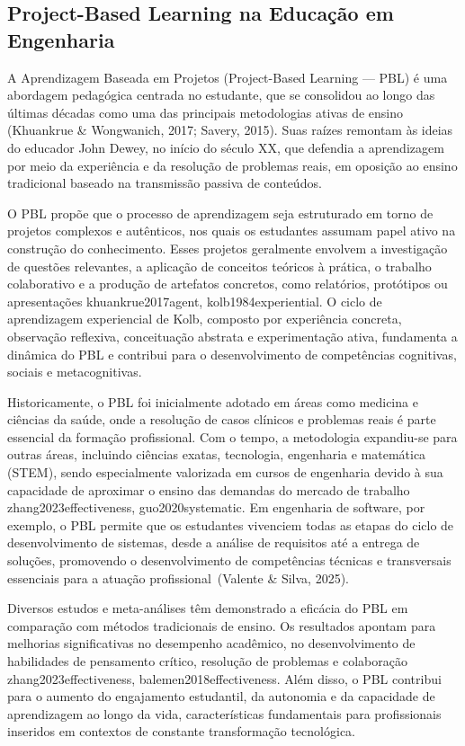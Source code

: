\documentclass[english, spanish, brazilian]{modelo_dt}
\begin{document}
\subsection{Project-Based Learning na Educação em Engenharia}

A Aprendizagem Baseada em Projetos (Project-Based Learning — PBL) é uma abordagem pedagógica centrada no estudante, que se consolidou ao longo das últimas décadas como uma das principais metodologias ativas de ensino (Khuankrue & Wongwanich, 2017; Savery, 2015). Suas raízes remontam às ideias do educador John Dewey, no início do século XX, que defendia a aprendizagem por meio da experiência e da resolução de problemas reais, em oposição ao ensino tradicional baseado na transmissão passiva de conteúdos.

O PBL propõe que o processo de aprendizagem seja estruturado em torno de projetos complexos e autênticos, nos quais os estudantes assumam papel ativo na construção do conhecimento. Esses projetos geralmente envolvem a investigação de questões relevantes, a aplicação de conceitos teóricos à prática, o trabalho colaborativo e a produção de artefatos concretos, como relatórios, protótipos ou apresentações {khuankrue2017agent, kolb1984experiential}. O ciclo de aprendizagem experiencial de Kolb, composto por experiência concreta, observação reflexiva, conceituação abstrata e experimentação ativa, fundamenta a dinâmica do PBL e contribui para o desenvolvimento de competências cognitivas, sociais e metacognitivas.

Historicamente, o PBL foi inicialmente adotado em áreas como medicina e ciências da saúde, onde a resolução de casos clínicos e problemas reais é parte essencial da formação profissional. Com o tempo, a metodologia expandiu-se para outras áreas, incluindo ciências exatas, tecnologia, engenharia e matemática (STEM), sendo especialmente valorizada em cursos de engenharia devido à sua capacidade de aproximar o ensino das demandas do mercado de trabalho {zhang2023effectiveness, guo2020systematic}. Em engenharia de software, por exemplo, o PBL permite que os estudantes vivenciem todas as etapas do ciclo de desenvolvimento de sistemas, desde a análise de requisitos até a entrega de soluções, promovendo o desenvolvimento de competências técnicas e transversais essenciais para a atuação profissional~(Valente & Silva, 2025).

Diversos estudos e meta-análises têm demonstrado a eficácia do PBL em comparação com métodos tradicionais de ensino. Os resultados apontam para melhorias significativas no desempenho acadêmico, no desenvolvimento de habilidades de pensamento crítico, resolução de problemas e colaboração {zhang2023effectiveness, balemen2018effectiveness}. Além disso, o PBL contribui para o aumento do engajamento estudantil, da autonomia e da capacidade de aprendizagem ao longo da vida, características fundamentais para profissionais inseridos em contextos de constante transformação tecnológica.
\end{document}

